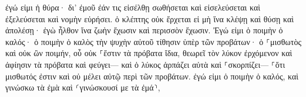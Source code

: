 \documentclass{openreader}
\begin{document}
ἐγώ εἰμι ἡ θύρα· δι’ ἐμοῦ ἐάν τις εἰσέλθῃ σωθήσεται καὶ εἰσελεύσεται καὶ ἐξελεύσεται καὶ νομὴν εὑρήσει. 
ὁ κλέπτης οὐκ ἔρχεται εἰ μὴ ἵνα κλέψῃ καὶ θύσῃ καὶ ἀπολέσῃ· ἐγὼ ἦλθον ἵνα ζωὴν ἔχωσιν καὶ περισσὸν ἔχωσιν. 
Ἐγώ εἰμι ὁ ποιμὴν ὁ καλός· ὁ ποιμὴν ὁ καλὸς τὴν ψυχὴν αὐτοῦ τίθησιν ὑπὲρ τῶν προβάτων· 
ὁ ⸀μισθωτὸς καὶ οὐκ ὢν ποιμήν, οὗ οὐκ ⸀ἔστιν τὰ πρόβατα ἴδια, θεωρεῖ τὸν λύκον ἐρχόμενον καὶ ἀφίησιν τὰ πρόβατα καὶ φεύγει— καὶ ὁ λύκος ἁρπάζει αὐτὰ καὶ ⸀σκορπίζει— 
⸀ὅτι μισθωτός ἐστιν καὶ οὐ μέλει αὐτῷ περὶ τῶν προβάτων. 
ἐγώ εἰμι ὁ ποιμὴν ὁ καλός, καὶ γινώσκω τὰ ἐμὰ καὶ ⸂γινώσκουσί με τὰ ἐμά⸃, 
\end{document}
